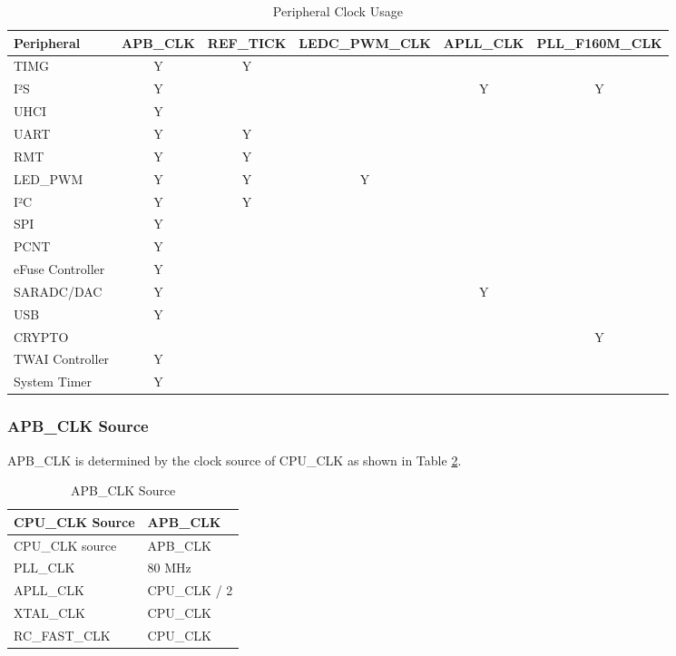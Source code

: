 \documentclass[main\_\_EN.tex]{subfiles}
\begin{document}
 \begin{longtable}[c]{|p{2.5cm}|c|c|c|c|c| }
 \caption{Peripheral Clock Usage}
    \label{table:peri clk owner} \\
  \hline
        \rowcolor{lightgray}
        Peripheral & APB\_CLK & REF\_TICK & LEDC\_PWM\_CLK & APLL\_CLK & PLL\_F160M\_CLK\\
        \hline
        TIMG & Y & Y &  &  &  \\
        \hline
        I²S & Y &  &  & Y & Y \\
        \hline
        UHCI & Y &  &  &  &  \\
        \hline
        UART & Y & Y &  &  &  \\
        \hline
        RMT & Y & Y &  &  &  \\
        \hline
        LED\_PWM & Y & Y & Y &  &  \\
        \hline
        I²C & Y & Y &  &  &  \\
        \hline
        SPI & Y &  &  &  &  \\
        \hline
        PCNT & Y &  &  &  &  \\
        \hline
        eFuse Controller & Y &  &  &  &  \\
        \hline
        SARADC/DAC & Y &  &  & Y &  \\
        \hline
        USB & Y &  &  &  &  \\
        \hline
        CRYPTO &  &  &  &  & Y \\
        \hline
        TWAI Controller & Y &  &  &  &  \\
        \hline
        System Timer & Y &  &  &  &  \\
        \hline
\end{longtable}

\subsubsection{APB\_CLK Source}\label{apbclkcource}

APB\_CLK is determined by the clock source of CPU\_CLK as shown in Table \ref{table:apb_clk_src}.

 \begin{longtable}[c]{ |p{7cm}|p{7cm}| }
      \caption{APB\_CLK Source}
    \label{table:apb_clk_src} \\
        \hline
        \rowcolor{lightgray}
        CPU\_CLK Source & APB\_CLK \\
        \hline
        \endfirsthead
        \hline
        \rowcolor{lightgray}
        CPU\_CLK source & APB\_CLK \\
        \hline
        \endhead
        \endfoot
        PLL\_CLK & 80 MHz \\
        \hline
        APLL\_CLK & CPU\_CLK / 2 \\
        \hline
        XTAL\_CLK & CPU\_CLK \\
        \hline
        RC\_FAST\_CLK & CPU\_CLK \\
        \hline
\end{longtable}
\end{document}
